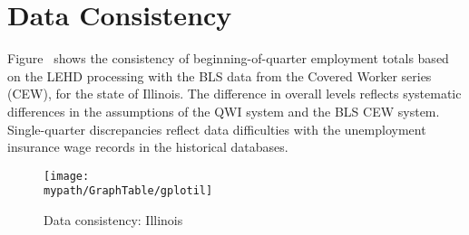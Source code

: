 
%
%



\section{Data Consistency}

Figure~  shows the consistency of
beginning-of-quarter employment totals based on the LEHD processing with
the BLS data from the Covered Worker series (CEW),
for the state of Illinois.
The difference in overall levels reflects systematic differences in the
assumptions of the QWI system and the BLS CEW system. Single-quarter
discrepancies reflect data difficulties with the unemployment insurance
wage records in the historical databases. 



%
\begin{figure}[htbp]
\begin{center}
\caption{Data consistency: Illinois\label{figure2}}
\centerline{\texttt{[image: \\mypath/GraphTable/gplotil]}}
\end{center}
\end{figure}
%
%
%


